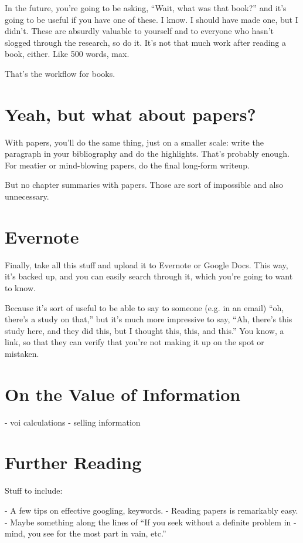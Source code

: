 In the future, you're going to be asking, ``Wait, what was that book?'' and it's
going to be useful if you have one of these. I know. I should have made one, but
I didn't. These are absurdly valuable to yourself and to everyone who hasn't
slogged through the research, so do it. It's not that much work after reading a
book, either. Like 500 words, max.

That's the workflow for books.

\section{Yeah, but what about papers?}

With papers, you'll do the same thing, just on a smaller scale: write the
paragraph in your bibliography and do the highlights. That's probably
enough. For meatier or mind-blowing papers, do the final long-form writeup.

But no chapter summaries with papers. Those are sort of impossible and also
unnecessary.

\section{Evernote}

Finally, take all this stuff and upload it to Evernote or Google Docs. This way,
it's backed up, and you can easily search through it, which you're going to want
to know.

Because it's sort of useful to be able to say to someone (e.g. in an email)
``oh, there's a study on that,'' but it's much more impressive to say, ``Ah,
there's this study here, and they did this, but I thought this, this, and
this.'' You know, a link, so that they can verify that you're not making it up
on the spot or mistaken.


\section{On the Value of Information}

- voi calculations
- selling information

\section{Further Reading}

Stuff to include:

- A few tips on effective googling, keywords.
- Reading papers is remarkably easy.
- Maybe something along the lines of ``If you seek without a definite problem in
- mind, you see for the most part in vain, etc.''
